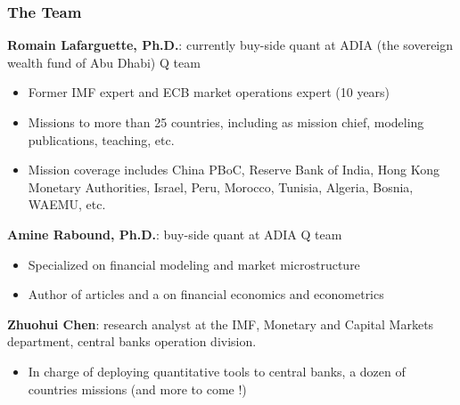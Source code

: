 \documentclass{beamer}
\newenvironment{wideitemize}{\itemize\addtolength{\itemsep}{10pt}}{\enditemize}
\begin{document}
\begin{frame}
  \frametitle{The Team}
  \begin{wideitemize}
  \item \textbf{Romain Lafarguette, Ph.D.}: currently buy-side quant at ADIA (the sovereign wealth fund of Abu Dhabi) Q team
    \begin{itemize}
    \item Former IMF expert and ECB market operations expert (10 years)
    \item Missions to more than 25 countries, including as mission chief, modeling publications, teaching, etc.
    \item Mission coverage includes China PBoC, Reserve Bank of India, Hong Kong Monetary Authorities, Israel, Peru, Morocco, Tunisia, Algeria, Bosnia, WAEMU, etc.  
    \end{itemize}
    
  \item \textbf{Amine Rabound, Ph.D.}: buy-side quant at ADIA Q team
    \begin{itemize}
    \item Specialized on financial modeling and market microstructure
    \item Author of articles and a \href{https://worldscientific.com/worldscibooks/10.1142/12731}{} on financial economics and econometrics
    \end{itemize}
    
  \item \textbf{Zhuohui Chen}: research analyst at the IMF, Monetary and Capital Markets department, central banks operation division.
    \begin{itemize}
    \item In charge of deploying quantitative tools to central banks, a dozen of countries missions (and more to come !)
    \end{itemize}
    
  \end{wideitemize}
  
\end{frame}
\end{document}
